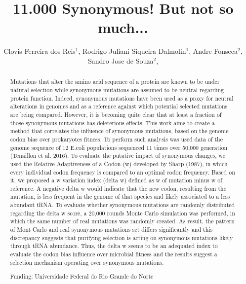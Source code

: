 \documentclass[twoside]{article}
\title{\vspace{-15mm}\fontsize{24pt}{10pt}\selectfont\textbf{ 11.000 Synonymous! But not so much... }} %
\author{ Clovis Ferreira dos Reis$^{1}$, Rodrigo Juliani Siqueira Dalmolin$^{1}$, Andre Fonseca$^{2}$, Sandro Jose de Souza$^{2}$, }
\affil{ 1 UFRN

2 Universidade Federal do Rio Grande do Norte

 }
\date{}
\begin{document}
  
  
  \maketitle %
  
  
  \thispagestyle{fancy} %
  
  
  \begin{abstract}
  Mutations that alter the amino acid sequence of a protein are known to be under natural selection while synonymous mutations are assumed to be neutral regarding protein function. Indeed, synonymous mutations have been used as a proxy for neutral alterations in genomes and as a reference against which potential selected mutations are being compared. However, it is becoming quite clear that at least a fraction of those synonymous mutations has deleterious effects. This work aims to create a method that correlates the influence of synonymous mutations, based on the genome codon bias over prokaryotes fitness. To perform such analysis was used data of the genome sequence of 12  E.coli populations sequenced 11 times over 50,000 generation (Tenaillon et al. 2016). To evaluate the putative impact of synonymous changes, we used the Relative Adaptiveness of a Codon (w) developed by Sharp (1987), in which every individual codon frequency is compared to an optimal codon frequency. Based on it, we proposed a w variation index (delta w)  defined as w of mutation minus w of reference. A negative delta w would indicate that the new codon, resulting from the mutation, is less frequent in the genome of that species and likely associated to a less abundant tRNA. To evaluate whether synonymous mutations are randomly distributed regarding the delta w score, a  20,000 rounds Monte Carlo simulation was performed, in which the same number of real mutations was randomly created.  As result, the pattern of Mont Carlo and real synonymous mutations set differs significantly and this discrepancy suggests that purifying selection is acting on synonymous mutations likely through tRNA abundance. Thus, the delta w seems to be an adequated index to evaluate the codon bias influence over microbial fitness and the results suggest a selection mechanism operating over synonymous mutations.
  
  Funding: Universidade Federal do Rio Grande do Norte \\ 
  \end{abstract}
  
\end{document}
